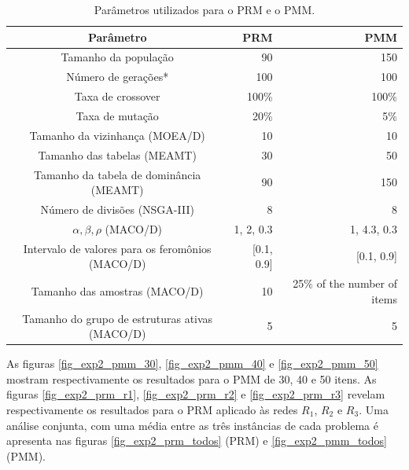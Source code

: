 \begin{table}[!htbp]
	\caption{Parâmetros utilizados para o PRM e o PMM.}
	\label{table_exp2_parametros}
	\begin{center}
		\begin{tabular}{c|r|r}
			\textbf{Parâmetro} & \textbf{PRM} &  \textbf{PMM} \\ %
			\hline
			Tamanho da população               &    90 &      150 \\ %
			Número de gerações*        &   100 &      100 \\ %
			Taxa de crossover                & 100\% &    100\% \\ %
			Taxa de mutação                 &  20\% &      5\% \\ %
			Tamanho da vizinhança (MOEA/D)    &    10 &       10 \\ %
			Tamanho das tabelas (MEAMT)   &    30 &       50 \\ %
			Tamanho da tabela de dominância (MEAMT) &    90 &      150 \\ %
			Número de divisões (NSGA-III)&     8 &        8 \\ %
			$\alpha, \beta, \rho$ (MACO/D)& 1, 2, 0.3 & 1, 4.3, 0.3 \\ %
			Intervalo de valores para os feromônios (MACO/D)& [0.1, 0.9] & [0.1, 0.9] \\ %
			Tamanho das amostras (MACO/D)& 10 &25\% of the number of items \\  %
			Tamanho do grupo de estruturas ativas (MACO/D)& 5 & 5 \\
			\hline
		\end{tabular}
	\end{center}
\end{table}

As figuras \ref{fig_exp2_pmm_30}, \ref{fig_exp2_pmm_40} e \ref{fig_exp2_pmm_50} mostram respectivamente os resultados para o PMM de 30, 40 e 50 itens. As figuras \ref{fig_exp2_prm_r1}, \ref{fig_exp2_prm_r2} e \ref{fig_exp2_prm_r3} revelam respectivamente os resultados para o PRM aplicado às redes $R_1$, $R_2$ e $R_3$. Uma análise conjunta, com uma média entre as três instâncias de cada problema é apresenta nas figuras \ref{fig_exp2_prm_todos} (PRM) e \ref{fig_exp2_pmm_todos} (PMM).

